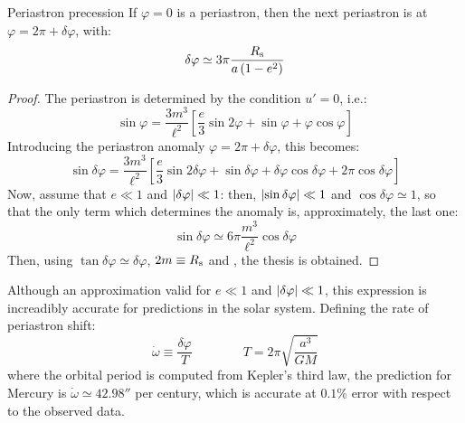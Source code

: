 \begin{proposition}{Periastron precession}{}
  If $ \varphi = 0 $ is a periastron, then the next periastron is at $ \varphi = 2\pi + \delta \varphi $, with:
  \begin{equation}
    \delta \varphi \simeq 3\pi \frac{R_\text{s}}{a \left( 1 - e^2 \right)}
  \end{equation}
\end{proposition}

\begin{proofbox}
  \begin{proof}
    The periastron is determined by the condition $ u' = 0 $, i.e.:
    \begin{equation*}
      \sin \varphi = \frac{3m^3}{\ell^2} \left[ \frac{e}{3} \sin 2\varphi + \sin \varphi + \varphi \cos \varphi \right]
    \end{equation*}
    Introducing the periastron anomaly $ \varphi = 2\pi + \delta \varphi $, this becomes:
    \begin{equation*}
      \sin \delta \varphi = \frac{3m^3}{\ell^2} \left[ \frac{e}{3} \sin 2 \delta \varphi + \sin \delta \varphi + \delta \varphi \cos \delta \varphi + 2 \pi \cos \delta \varphi \right]
    \end{equation*}
    Now, assume that $ e \ll 1 $ and $ \left\lvert\delta \varphi\right\rvert \ll 1 $: then, $ \left\lvert\sin \delta \varphi\right\rvert \ll 1 $ and $ \cos \delta \varphi \simeq 1 $, so that the only term which determines the anomaly is, approximately, the last one:
    \begin{equation*}
      \sin \delta \varphi \simeq 6\pi \frac{m^3}{\ell^2} \cos \delta \varphi
    \end{equation*}
    Then, using $ \tan \delta \varphi \simeq \delta \varphi $, $ 2m \equiv R_\text{s} $ and , the thesis is obtained.
  \end{proof}
\end{proofbox}

Although an approximation valid for $ e \ll 1 $ and $ \left\lvert\delta \varphi\right\rvert \ll 1 $, this expression is increadibly accurate for predictions in the solar system. Defining the rate of periastron shift:
\begin{equation}
  \dot{\omega} \equiv \frac{\delta \varphi}{T}
  \qquad \qquad
  T = 2\pi \sqrt{\frac{a^3}{GM}}
\end{equation}
where the orbital period is computed from Kepler's third law, the prediction for Mercury is $ \dot{\omega} \simeq 42.98'' $ per century, which is accurate at $ 0.1\% $ error with respect to the observed data.


